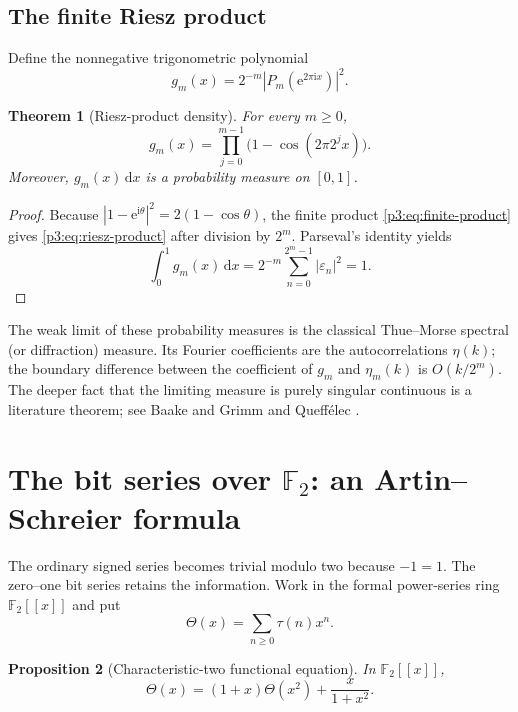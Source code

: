 \documentclass[11pt,oneside]{article}
\newtheorem{theorem}{Theorem}[section]
\newtheorem{proposition}[theorem]{Proposition}
\theoremstyle{definition}
\theoremstyle{remark}
\newcommand{\F}{\mathbb F}
\newcommand{\e}{\mathrm e}
\newcommand{\ii}{\mathrm i}
\newcommand{\dd}{\,\mathrm d}
\newcommand{\eps}{\varepsilon}
\newcommand{\1}{\mathbf 1}
\begin{document}
\subsection{The finite Riesz product}

Define the nonnegative trigonometric polynomial
\begin{equation}
 g_m(x)=2^{-m}\left|P_m(\e^{2\pi\ii x})\right|^2.
 \label{p3:eq:gm-def}
\end{equation}

\begin{theorem}[Riesz-product density]
\label{p3:thm:riesz-finite}
For every \(m\ge0\),
\begin{equation}
 \boxed{
 g_m(x)=\prod_{j=0}^{m-1}\bigl(1-\cos(2\pi2^jx)\bigr).}
 \label{p3:eq:riesz-product}
\end{equation}
Moreover, \(g_m(x)\dd x\) is a probability measure on \([0,1]\).
\end{theorem}

\begin{proof}
Because \(|1-\e^{\ii\theta}|^2=2(1-\cos\theta)\), the finite product
\eqref{p3:eq:finite-product} gives \eqref{p3:eq:riesz-product} after division by \(2^m\).  Parseval's
identity yields
\[
 \int_0^1g_m(x)\dd x
 =2^{-m}\sum_{n=0}^{2^m-1}|\eps_n|^2=1.
\]
\end{proof}

The weak limit of these probability measures is the classical Thue--Morse spectral (or
diffraction) measure.  Its Fourier coefficients are the autocorrelations \(\eta(k)\); the
boundary difference between the coefficient of \(g_m\) and \(\eta_m(k)\) is
\(O(k/2^m)\).  The deeper fact that the limiting measure is purely singular continuous is a
literature theorem; see Baake and Grimm \cite{p3:baakegrimm2009} and Queff\'elec
\cite{p3:queffelec2010}.

\section{The bit series over \texorpdfstring{\(\F_2\)}{F2}: an Artin--Schreier formula}
\label{p3:sec:F2}

The ordinary signed series becomes trivial modulo two because \(-1=1\).  The zero--one bit
series retains the information.  Work in the formal power-series ring \(\F_2[[x]]\) and put
\begin{equation}
 \Theta(x)=\sum_{n\ge0}\tau(n)x^n.
 \label{p3:eq:Theta}
\end{equation}

\begin{proposition}[Characteristic-two functional equation]
\label{p3:prop:F2-functional}
In \(\F_2[[x]]\),
\begin{equation}
 \Theta(x)=(1+x)\Theta(x^2)+\frac{x}{1+x^2}.
 \label{p3:eq:F2-functional}
\end{equation}
\end{proposition}
\end{document}
